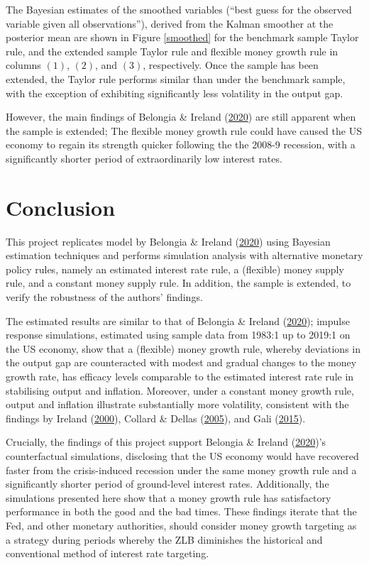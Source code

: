 \documentclass[11pt,preprint, authoryear]{elsarticle}
\numberwithin{equation}{section}
\numberwithin{figure}{section}
\numberwithin{table}{section}
\begin{document}
The Bayesian estimates of the smoothed variables (``best guess for the
observed variable given all observations''), derived from the Kalman
smoother at the posterior mean are shown in Figure \ref{smoothed} for
the benchmark sample Taylor rule, and the extended sample Taylor rule
and flexible money growth rule in columns \((1)\), \((2)\), and \((3)\),
respectively. Once the sample has been extended, the Taylor rule
performs similar than under the benchmark sample, with the exception of
exhibiting significantly less volatility in the output gap.

However, the main findings of Belongia \& Ireland
(\protect\hyperlink{ref-belongia2020}{2020}) are still apparent when the
sample is extended; The flexible money growth rule could have caused the
US economy to regain its strength quicker following the the 2008-9
recession, with a significantly shorter period of extraordinarily low
interest rates.

\hypertarget{conclusion}{%
\section{Conclusion}\label{conclusion}}

This project replicates model by Belongia \& Ireland
(\protect\hyperlink{ref-belongia2020}{2020}) using Bayesian estimation
techniques and performs simulation analysis with alternative monetary
policy rules, namely an estimated interest rate rule, a (flexible) money
supply rule, and a constant money supply rule. In addition, the sample
is extended, to verify the robustness of the authors' findings.

The estimated results are similar to that of Belongia \& Ireland
(\protect\hyperlink{ref-belongia2020}{2020}); impulse response
simulations, estimated using sample data from 1983:1 up to 2019:1 on the
US economy, show that a (flexible) money growth rule, whereby deviations
in the output gap are counteracted with modest and gradual changes to
the money growth rate, has efficacy levels comparable to the estimated
interest rate rule in stabilising output and inflation. Moreover, under
a constant money growth rule, output and inflation illustrate
substantially more volatility, consistent with the findings by Ireland
(\protect\hyperlink{ref-ireland2000}{2000}), Collard \& Dellas
(\protect\hyperlink{ref-collard2005}{2005}), and Gali
(\protect\hyperlink{ref-gali2015}{2015}).

Crucially, the findings of this project support Belongia \& Ireland
(\protect\hyperlink{ref-belongia2020}{2020})'s counterfactual
simulations, disclosing that the US economy would have recovered faster
from the crisis-induced recession under the same money growth rule and a
significantly shorter period of ground-level interest rates.
Additionally, the simulations presented here show that a money growth
rule has satisfactory performance in both the good and the bad times.
These findings iterate that the Fed, and other monetary authorities,
should consider money growth targeting as a strategy during periods
whereby the ZLB diminishes the historical and conventional method of
interest rate targeting.
\end{document}
